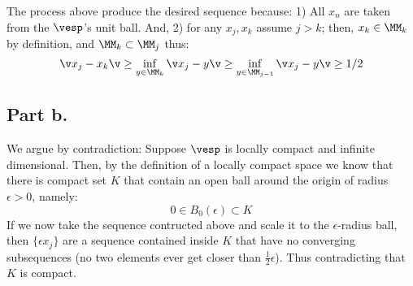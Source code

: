 The process above produce the desired sequence because: 1) All $x_n$ are taken from the $\vesp$'s unit ball.
And, 2) for any $x_j,x_k$ assume $j>k$; then, $x_k \in \MM_k$ by definition, and $\MM_k\subset \MM_j$ thus:
$$\v x_j - x_k\v\geq \inf_{y\in \MM_{k}}\v x_j -y \v \geq \inf_{y\in \MM_{j-1}} \v x_j -y\v \geq 1/2$$

\subsection*{Part \textbf{b.}}
We argue by contradiction:
Suppose $\vesp$ is locally compact and infinite dimensional. 
Then, by the definition of a locally compact space we know that there is compact set $K$ that contain an open ball around the origin of radius $\epsilon>0$, namely:
$$0\in B_0(\epsilon) \subset K$$
If we now take the sequence contructed above and scale it to the $\epsilon$-radius ball, then $\{\epsilon x_j \}$ are a sequence contained inside $K$ that have no converging subsequences (no two elements ever get closer than $\frac 12 \epsilon$).
Thus contradicting that $K$ is compact. 
